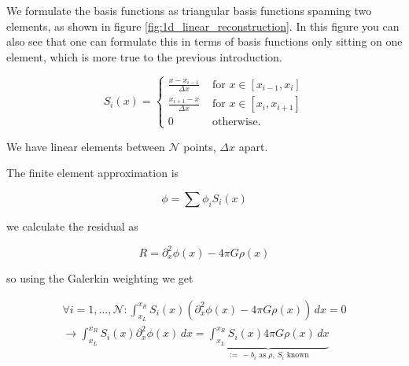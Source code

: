 
We formulate the basis functions as triangular basis functions spanning two elements, as
shown in figure \ref{fig:1d_linear_reconstruction}. In this figure you can also see
that one can formulate this in terms of basis functions only sitting on one element,
which is more true to the previous introduction.

\begin{equation}
    S_i(x)=\left\{\begin{array}{cc}
    \frac{x-x_{i-1}}{\Delta x} & \text { for } x \in\left[x_{i-1}, x_i\right] \\
    \frac{x_{i+1}-x}{\Delta x} & \text { for } x \in\left[x_i, x_{i+1}\right] \\
    0 & \text { otherwise. }
    \end{array}\right.
\end{equation}

We have linear elements between $\mathcal{N}$ points, $\Delta x$ apart.

The finite element approximation is

\begin{equation}
    \phi = \sum \phi_i S_i(x)
\end{equation}

we calculate the residual as

\begin{equation}
    R = \partial_x^2 \phi(x) - 4\pi G \rho(x)
\end{equation}

so using the Galerkin weighting we get

\begin{equation}
    \begin{gathered}
        \forall i=1,...,\mathcal{N}: \int_{x_L}^{x_R} S_i(x) \left( \partial_x^2 \phi(x) - 4\pi G \rho(x) \right) \, dx = 0 \\
        \rightarrow \int_{x_L}^{x_R} S_i(x) \partial_x^2 \phi(x) \, dx = \underbrace{\int_{x_L}^{x_R} S_i(x) 4\pi G \rho(x) \, dx}_{:=\, -b_i \text{ as } \rho,\, S_i \text{ known}}
    \end{gathered}
\end{equation}

